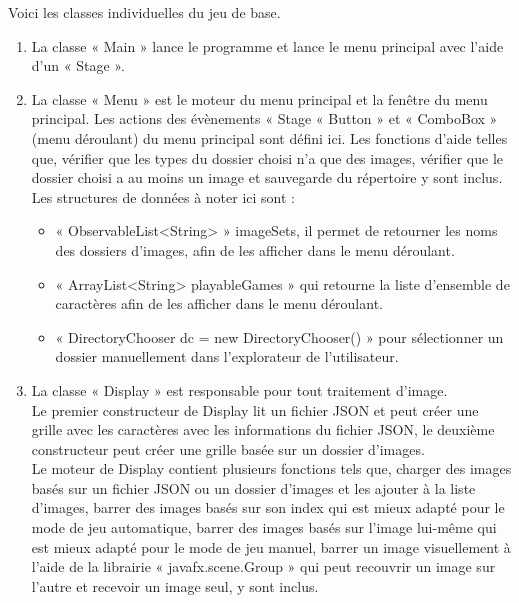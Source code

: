 \documentclass[a4paper]{article}
\begin{document}
Voici les classes individuelles du jeu de base.
\begin{enumerate}
    \item      La classe « Main » lance le programme et lance le menu principal avec l’aide d’un « Stage ».\\
    
    \item      La classe « Menu » est le moteur du menu principal et la fenêtre du menu principal. Les actions des évènements « Stage « Button » et « ComboBox » (menu déroulant) du menu principal sont défini ici. Les fonctions d’aide telles que, vérifier que les types du dossier choisi n’a que des images, vérifier que le dossier choisi a au moins un image et sauvegarde du répertoire y sont inclus.\\
    Les structures de données à noter ici sont :
    \begin{itemize}
        \item « ObservableList<String> » imageSets, il permet de retourner les noms des dossiers d’images, afin de les afficher dans le menu déroulant.
        \item « ArrayList<String> playableGames » qui retourne la liste d’ensemble de caractères afin de les afficher dans le menu déroulant.
        \item « DirectoryChooser dc = new DirectoryChooser() » pour sélectionner un dossier manuellement dans l’explorateur de l’utilisateur.\\
    \end{itemize}
 
    \item      La classe « Display » est responsable pour tout traitement d’image.\\
    Le premier constructeur de Display lit un fichier JSON et peut créer une grille avec les caractères avec les informations du fichier JSON, le deuxième constructeur peut créer une grille basée sur un dossier d’images.\\
    Le moteur de Display contient plusieurs fonctions tels que, charger des images basés sur un fichier JSON ou un dossier d’images et les ajouter à la liste d’images, barrer des images basés sur son index qui est mieux adapté pour le mode de jeu automatique, barrer des images basés sur l’image lui-même qui est mieux adapté pour le mode de jeu manuel, barrer un image visuellement à l’aide de la librairie « javafx.scene.Group » qui peut recouvrir un image sur l’autre et recevoir un image seul, y sont inclus.\\
    

\end{enumerate}
\end{document}
